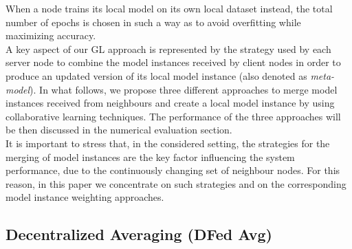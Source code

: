 \documentclass[conference]{IEEEtran}
\begin{document}
When a node trains its local model on its own local dataset instead, the total number of epochs is chosen in such a way as to avoid overfitting while maximizing accuracy.\\
A key aspect of our GL approach is represented by the strategy used by each server node to combine the model instances received by client nodes in order to produce an updated version of its local model instance (also denoted as \textit{meta-model}).
In what follows, we propose three different approaches to merge model instances received from neighbours and create a local model instance by using collaborative learning techniques. The performance of the three approaches will be then discussed in the numerical evaluation section.\\
It is important to stress that, in the considered setting, the strategies for the merging of model instances are the key factor influencing the system performance, due to the continuously changing set of neighbour nodes. For this reason, in this paper we concentrate on such strategies and on the corresponding model instance weighting approaches. 
%
\vspace{-0.1in}
\subsection{Decentralized  Averaging (DFed Avg)}
\end{document}
